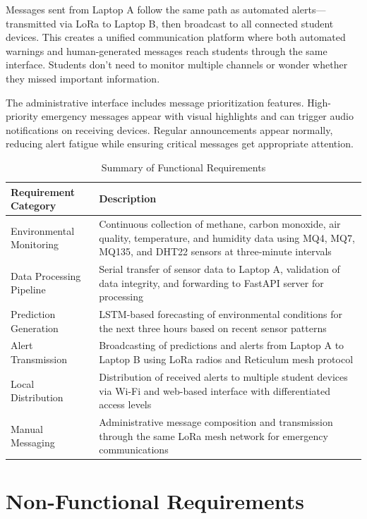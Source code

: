 Messages sent from Laptop A follow the same path as automated alerts—transmitted via LoRa to Laptop B, then broadcast to all connected student devices. This creates a unified communication platform where both automated warnings and human-generated messages reach students through the same interface. Students don't need to monitor multiple channels or wonder whether they missed important information.

The administrative interface includes message prioritization features. High-priority emergency messages appear with visual highlights and can trigger audio notifications on receiving devices. Regular announcements appear normally, reducing alert fatigue while ensuring critical messages get appropriate attention.

\begin{table}[H]
\centering
\caption{Summary of Functional Requirements}
\label{tab:functional_requirements}
\begin{tabular}{|p{4.5cm}|p{10cm}|}
\hline
\textbf{Requirement Category} & \textbf{Description} \\
\hline
Environmental Monitoring & Continuous collection of methane, carbon monoxide, air quality, temperature, and humidity data using MQ4, MQ7, MQ135, and DHT22 sensors at three-minute intervals \\
\hline
Data Processing Pipeline & Serial transfer of sensor data to Laptop A, validation of data integrity, and forwarding to FastAPI server for processing \\
\hline
Prediction Generation & LSTM-based forecasting of environmental conditions for the next three hours based on recent sensor patterns \\
\hline
Alert Transmission & Broadcasting of predictions and alerts from Laptop A to Laptop B using LoRa radios and Reticulum mesh protocol \\
\hline
Local Distribution & Distribution of received alerts to multiple student devices via Wi-Fi and web-based interface with differentiated access levels \\
\hline
Manual Messaging & Administrative message composition and transmission through the same LoRa mesh network for emergency communications \\
\hline
\end{tabular}
\end{table}

\section{Non-Functional Requirements}

